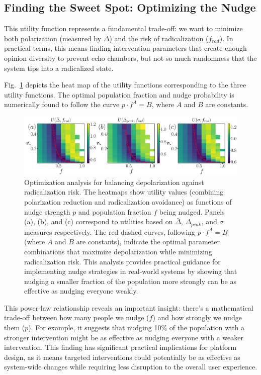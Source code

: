 \subsection{Finding the Sweet Spot: Optimizing the Nudge}
This utility function represents a fundamental trade-off: we want to minimize both polarization (measured by $\bar{\Delta}$) and the risk of radicalization ($f_{rad}$). In practical terms, this means finding intervention parameters that create enough opinion diversity to prevent echo chambers, but not so much randomness that the system tips into a radicalized state.

Fig.~\ref{fig:optimization} depicts the heat map of the utility functions corresponding to the three utility functions. The optimal population fraction and nudge probability is numerically found to follow the curve $p\cdot f^A = B$, where $A$ and $B$ are constants.
\begin{figure}[H]
    \centering
    \includegraphics[width=\textwidth]{chapters/chapter2/optimization_heatmap.pdf}
    \caption{Optimization analysis for balancing depolarization against radicalization risk. The heatmaps show utility values (combining polarization reduction and radicalization avoidance) as functions of nudge strength $p$ and population fraction $f$ being nudged. Panels (a), (b), and (c) correspond to utilities based on $\bar \Delta$, $\Delta_{peak}$, and $\sigma$ measures respectively. The red dashed curves, following $p\cdot f^A = B$ (where $A$ and $B$ are constants), indicate the optimal parameter combinations that maximize depolarization while minimizing radicalization risk. This analysis provides practical guidance for implementing nudge strategies in real-world systems by showing that nudging a smaller fraction of the population more strongly can be as effective as nudging everyone weakly.}
    \label{fig:optimization}
\end{figure}
This power-law relationship reveals an important insight: there's a mathematical trade-off between how many people we nudge ($f$) and how strongly we nudge them ($p$). For example, it suggests that nudging 10\% of the population with a stronger intervention might be as effective as nudging everyone with a weaker intervention. This finding has significant practical implications for platform design, as it means targeted interventions could potentially be as effective as system-wide changes while requiring less disruption to the overall user experience.
